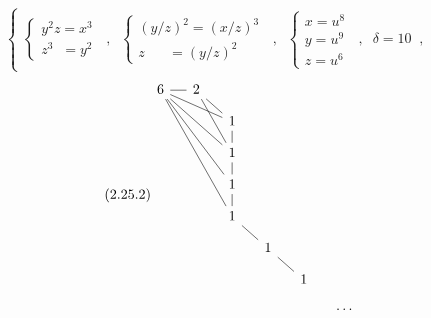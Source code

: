 \begin{equation}\tag{2.25.2}
\left\{
\begin{array}{l}
\left\{\begin{array}{l} y^{2}z = x^{3} \\ z^{3} \;\; = y^{2} \end{array}\right. \;\;,\;\;
\left\{\begin{array}{l} (y/z)^{2} = (x/z)^{3} \\ z \;\;\;\;\;\; = (y/z)^{2} \end{array}\right. \;\;,\;\;
\left\{\begin{array}{l} x = u^{8} \\ y = u^{9} \\ z = u^{6} \end{array}\right. \;\;,\;\; \delta = 10 \;\;,
\end{array}
\right.
\end{equation}
\begin{equation}\tag{2.25.2}
\begin{tikzcd}[column sep=small, row sep=small]
6 \arrow[r, dash] \arrow[rrd, dash] \arrow[rrdd, dash] \arrow[rrddd, dash] \arrow[rrdddd, dash] & 2 \arrow[rd, dash] \arrow[rdd, dash] & & & & \\
& & 1 \arrow[d, dash] & & & \\
& & 1 \arrow[d, dash] & & & \\
& & 1 \arrow[d, dash] & & & \\
& & 1 \arrow[rd, dash] & & & \\
& & & 1 \arrow[rd, dash] & & \\
& & & & 1 & \\
& & & & & \cdots
\end{tikzcd}
\end{equation}
